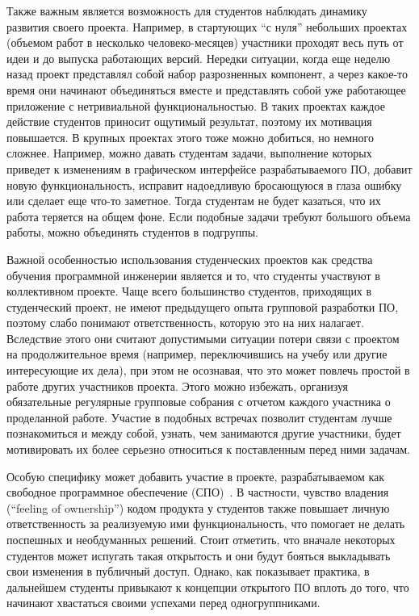 \documentclass[a4paper]{article}
\begin{document}
Также важным является возможность для студентов наблюдать динамику развития своего проекта. Например, в стартующих ``с нуля'' небольших проектах (объемом работ в несколько человеко-месяцев) участники проходят весь путь от идеи и до выпуска работающих версий. Нередки ситуации, когда еще неделю назад проект представлял собой набор разрозненных компонент, а через какое-то время они начинают объединяться вместе и представлять собой уже работающее приложение с нетривиальной функциональностью. В таких проектах каждое действие студентов приносит ощутимый результат, поэтому их мотивация повышается. В крупных проектах этого тоже можно добиться, но немного сложнее. Например, можно давать студентам задачи, выполнение которых приведет к изменениям в графическом интерфейсе разрабатываемого ПО, добавит новую функциональность, исправит надоедливую бросающуюся в глаза ошибку или сделает еще что-то заметное. Тогда студентам не будет казаться, что их работа теряется на общем фоне. Если подобные задачи требуют большого объема работы, можно объединять студентов в подгруппы.


Важной особенностью использования студенческих проектов как средства обучения программной инженерии является и то, что студенты участвуют в коллективном проекте. Чаще всего большинство студентов, приходящих в студенческий проект, не имеют предыдущего опыта групповой разработки ПО, поэтому слабо понимают ответственность, которую это на них налагает. Вследствие этого они считают допустимыми ситуации потери связи с проектом на продолжительное время (например, переключившись на учебу или другие интересующие их дела), при этом не осознавая, что это может повлечь простой в работе других участников проекта. Этого можно избежать, организуя обязательные регулярные групповые собрания с отчетом каждого участника о проделанной работе. Участие в подобных встречах позволит студентам лучше познакомиться и между собой, узнать, чем занимаются другие участники, будет мотивировать их более серьезно относиться к поставленным перед ними задачам.

Особую специфику может добавить участие в проекте, разрабатываемом как свободное программное обеспечение (СПО)~\cite{saratov}. В частности, чувство владения (``feeling of ownership'') кодом продукта у студентов также повышает личную ответственность за реализуемую ими функциональность, что помогает не делать поспешных и необдуманных решений. Стоит отметить, что вначале некоторых студентов может испугать такая открытость и они будут бояться выкладывать свои изменения в публичный доступ. Однако, как показывает практика, в дальнейшем студенты привыкают к концепции открытого ПО вплоть до того, что начинают хвастаться своими успехами перед одногруппниками.
\end{document}
